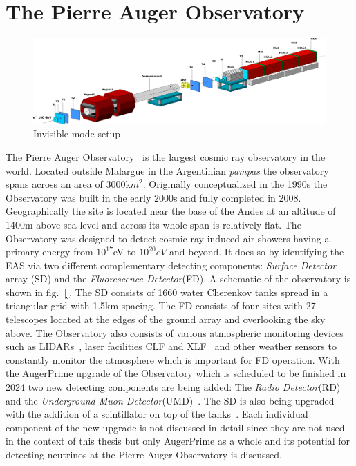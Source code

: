 
\chapter{The Pierre Auger Observatory}
\label{sec:setup}
\begin{figure}[h!]
\centering
\includegraphics[width=\textwidth]{thesis_figures/Invisible_3d_setup.png}
\caption{Invisible mode setup~\cite{Banerjee:2016tad}}
\label{fig:Invisible_mode_setup}
\end{figure}

The Pierre Auger Observatory~\cite{} is the largest cosmic ray observatory in the world. Located outside Malargue in the Argentinian \textit{pampas} the observatory spans across an area of 3000k$m^2$. Originally conceptualized in the 1990s the Observatory was built in the early 2000s and fully completed in 2008. Geographically the site is located near the base of the Andes at an altitude of 1400m above sea level and across its whole span is relatively flat. The Observatory was designed to detect cosmic ray induced air showers having a primary energy from $10^{17}$eV to $10^{20}eV$ and beyond. It does so by identifying the EAS via two different complementary detecting components: \textit{Surface Detector} array (SD) and the \textit{Fluorescence Detector}(FD). A schematic of the observatory is shown in fig.~\ref{}. The SD consists of 1660 water Cherenkov tanks spread in a triangular grid with 1.5km spacing. The FD consists of four sites with 27 telescopes located at the edges of the ground array and overlooking the sky above. The Observatory also consists of various atmospheric monitoring devices such as LIDARs~\cite{}, laser facilities CLF and XLF~\cite{} and other weather sensors to constantly monitor the atmosphere which is important for FD operation. With the AugerPrime upgrade of the Observatory which is scheduled to be finished in 2024 two new detecting components are being added: The \textit{Radio Detector}(RD)~\cite{} and the \textit{Underground Muon Detector}(UMD)~\cite{}. The SD is also being upgraded with the addition of a scintillator on top of the tanks~\cite{}. Each individual component of the new upgrade is not discussed in detail since they are not used in the context of this thesis but only AugerPrime as a whole and its potential for detecting neutrinos at the Pierre Auger Observatory is discussed.

